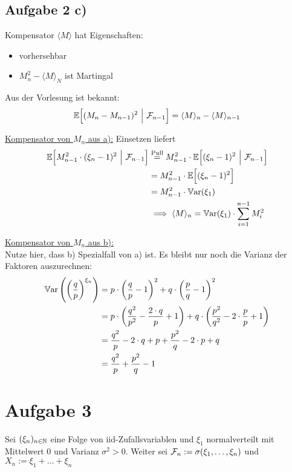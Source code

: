 \documentclass[12pt,a4paper]{article}
\begin{document}
\subsection*{Aufgabe 2 c)}
Kompensator $\langle M\rangle$ hat Eigenschaften:
\begin{itemize}
\item vorhersehbar
\item $M_n^2-\langle M\rangle_N$ ist Martingal
\end{itemize}
Aus der Vorlesung ist bekannt:
\begin{align*}
\mathbb{E}\Big[(M_n-M_{n-1})^2~\Big|~\mathcal{F}_{n-1}\Big]=\langle M\rangle_n-\langle M\rangle_{n-1}
\end{align*}

\underline{Kompensator von $M_n$ aus a):} Einsetzen liefert
\begin{align*}
\mathbb{E}\Big[M_{n-1}^2\cdot(\xi_n-1)^2~\Big|~\mathcal{F}_{n-1}\Big]
&\stackrel{\text{Pull}}{=}
M_{n-1}^2\cdot\mathbb{E}\Big[(\xi_{n}-1)^2~\Big|~\mathcal{F}_{n-1}\Big]\\
&=M_{n-1}^2\cdot\mathbb{E}\Big[(\xi_n-1)^2\Big]\\
&=M_{n-1}^2\cdot\mathbb{V}\text{ar}(\xi_1)\\
&\implies
\langle M\rangle_n=\mathbb{V}\text{ar}(\xi_1)\cdot\sum\limits_{i=1}^{n-1} M_i^2
\end{align*}

\underline{Kompensator von $M_n$ aus b):}\\
Nutze hier, dass b) Spezialfall von a) ist. Es bleibt nur noch die Varianz der Faktoren auszurechnen:
\begin{align*}
\mathbb{V}\text{ar}\left(\left(\frac{q}{p}\right)^{\xi_n}\right)
&=p\cdot\left(\frac{q}{p}-1\right)^2+q\cdot\left(\frac{p}{q}-1\right)^2\\
&=p\cdot\left(\frac{q^2}{p^2}-\frac{2\cdot q}{p}+1\right)+q\cdot\left(\frac{p^2}{q^2}-2\cdot\frac{p}{p}+1\right)\\
&=\frac{q^2}{p}-2\cdot q+p+\frac{p^2}{q}-2\cdot p+q\\
&=\frac{q^2}{p}+\frac{p^2}{q}-1
\end{align*}


\section*{Aufgabe 3}
Sei $(\xi_n)_{n\in\mathbb{N}}$ eine Folge von iid-Zufallsvariablen und $\xi_1$ normalverteilt mit Mittelwert 0 und Varianz $\sigma^2>0$. Weiter sei $\mathcal{F}_n:=\sigma(\xi_1,\ldots,\xi_n)$ und\\ $X_n:=\xi_1+\ldots+\xi_n$
\end{document}

